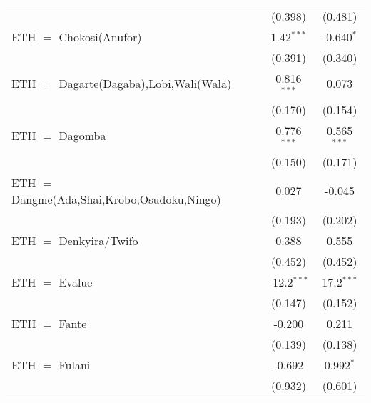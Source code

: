 \begin{table}[htbp!]
\begin{adjustbox}{width = 1\textwidth, max height = 0.95\textheight, center}
\begin{threeparttable}[b]
\begin{tabular}{lcc}
                                                                                      & (0.398)       & (0.481)\\   
            ETH $=$ Chokosi(Anufor)                                                   & 1.42$^{***}$  & -0.640$^{*}$\\   
                                                                                      & (0.391)       & (0.340)\\   
            ETH $=$ Dagarte(Dagaba),Lobi,Wali(Wala)                                   & 0.816$^{***}$ & 0.073\\   
                                                                                      & (0.170)       & (0.154)\\   
            ETH $=$ Dagomba                                                           & 0.776$^{***}$ & 0.565$^{***}$\\   
                                                                                      & (0.150)       & (0.171)\\   
            ETH $=$ Dangme(Ada,Shai,Krobo,Osudoku,Ningo)                              & 0.027         & -0.045\\   
                                                                                      & (0.193)       & (0.202)\\   
            ETH $=$ Denkyira/Twifo                                                    & 0.388         & 0.555\\   
                                                                                      & (0.452)       & (0.452)\\   
            ETH $=$ Evalue                                                            & -12.2$^{***}$ & 17.2$^{***}$\\   
                                                                                      & (0.147)       & (0.152)\\   
            ETH $=$ Fante                                                             & -0.200        & 0.211\\   
                                                                                      & (0.139)       & (0.138)\\   
            ETH $=$ Fulani                                                            & -0.692        & 0.992$^{*}$\\   
                                                                                      & (0.932)       & (0.601)\\   

\end{tabular}
\end{threeparttable}
\end{adjustbox}
\end{table}
